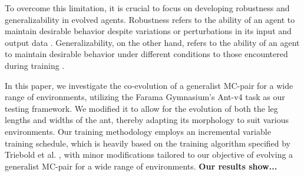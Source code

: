 To overcome this limitation, it is crucial to focus on developing robustness and generalizability in evolved agents. Robustness refers to the ability of an agent to maintain desirable behavior despite variations or perturbations in its input and output data \cite{Ravi_Mangal_2019, Charles_Packer_2019, Xu_Mengdi_2022}. Generalizability, on the other hand, refers to the ability of an agent to maintain desirable behavior under different conditions to those encountered during training \cite{Charles_Packer_2019,Xu_Mengdi_2022}. 

In this paper, we investigate the co-evolution of a generalist MC-pair for a wide range of environments, utilizing the Farama Gymnasium's Ant-v4 task \cite{Gymnasium2023} as our testing framework. We modified it to allow for the evolution of both the leg lengths and widths of the ant, thereby adapting its morphology to suit various environments. Our training methodology employs an incremental variable training schedule, which is heavily based on the training algorithm specified by Triebold et al. \cite{Corinna_Triebold}, with minor modifications tailored to our objective of evolving a generalist MC-pair for a wide range of environments. \textbf{Our results show...}